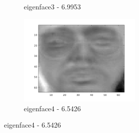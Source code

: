 \documentclass[a4paper]{article}
\begin{document}
\begin{figure}[H]
\begin{subfigure}[c]{0.24\textwidth}
        \caption{eigenface3 - 6.9953}
        \label{subfig:ex2_x3}
    \end{subfigure}
    \begin{subfigure}[c]{0.24\textwidth}
        \centering
        \includegraphics[width=0.65\textwidth]{images/ex2_x4.png}
        \caption{eigenface4 - 6.5426}
        \label{subfig:ex2_x4}
    \end{subfigure}


\end{figure}
\end{document}
